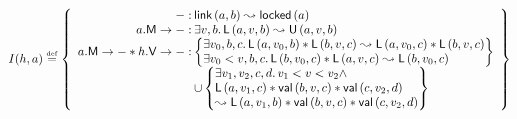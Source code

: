 \[
	I(h, a) \eqdef 
	\left\{
	\begin{array}{r @ {\hspace*{2pt}}l}
		- : & \link{a}{b} \swap \locked{a}\\
		
		\modT{a} : & \exsts{v, b} \lockedNode{a}{v}{b} \swap \unlockedNode{a}{v}{b}\\
		
%
		
		\modT{a} * \valueT{h}{v}: &
		\left\{
		\begin{array}{@{} l @{}}
			\exsts{v_0, b, c} \lockedNode{a}{v_0}{b} * \lockedNode{b}{v}{c} \swap \lockedNode{a}{v_0}{c} * \lockedNode{b}{v}{c}\\
			\exsts{v_0 < v, b, c} \lockedNode{b}{v_0}{c} * \lockedNode{a}{v}{c} \swap \lockedNode{b}{v_0}{c}
			
		\end{array}
		\right\}\\
		
		&\cup 
		\left\{
		\begin{array}{@{} l @{}}
			 \exsts{v_1, v_2, c, d} v_1 < v < v_2 \land\\
			 \lockedNode{a}{v_1}{c} * \val{b}{v}{c} * \val{c}{v_2}{d} \\
	  		\swap \lockedNode{a}{v_1}{b} * \val{b}{v}{c} *  \val{c}{v_2}{d}		
		\end{array}
		\right\}\\ 

%		
%			 
%						
		
	\end{array}
	\right\}
\]
